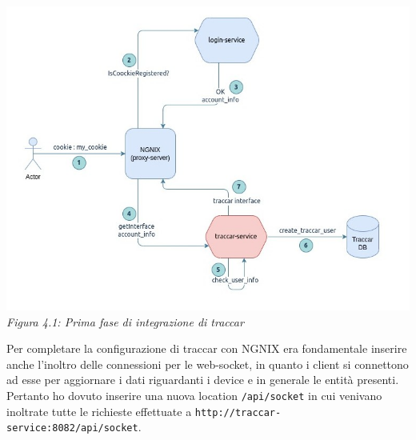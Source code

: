 \documentclass[a4paper,titlepage,12pt]{book}
\begin{document}
{\begin{center}
\centering
\includegraphics[scale=0.6]{images/traccar_login_serv.jpg}\\ 
\textit{Figura 4.1: Prima fase di integrazione di traccar}\label{fig:}

\end{center}

Per completare la configurazione di traccar con NGNIX era fondamentale inserire anche l'inoltro delle connessioni per le web-socket, in quanto i client si connettono ad esse per aggiornare i dati riguardanti i device e in generale le entità presenti. Pertanto ho dovuto inserire una nuova location \texttt{/api/socket} in cui venivano inoltrate tutte le richieste effettuate a \texttt{http://traccar-service:8082/api/socket}.


}
\end{document}
